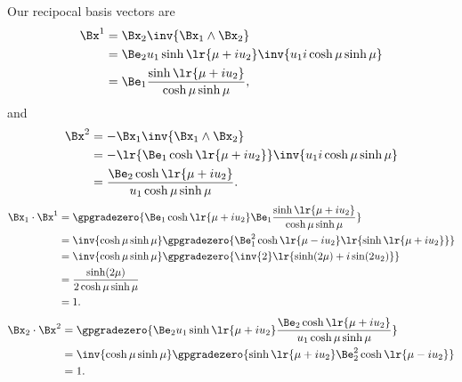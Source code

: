 {Our recipocal basis vectors are
\begin{equation}\label{eqn:ellipticproblem:240}
\begin{aligned}
   \Bx^1
   &= \Bx_2 \inv{ \Bx_1 \wedge \Bx_2 } \\
   &= \Be_2 u_1 \sinh\lr{ \mu + i u_2 } \inv{u_1 i \cosh \mu \sinh \mu} \\
   &= \Be_1 \frac{\sinh\lr{ \mu + i u_2 }}{\cosh \mu \sinh \mu},
\end{aligned}
\end{equation}
and
\begin{equation}\label{eqn:ellipticproblem:180}
\begin{aligned}
\Bx^2
   &= -\Bx_1 \inv{ \Bx_1 \wedge \Bx_2 } \\
   &= -\lr{ \Be_1 \cosh\lr{ \mu + i u_2 } } \inv{ u_1 i \cosh \mu \sinh \mu} \\
   &= \frac{ \Be_2 \cosh\lr{ \mu + i u_2 } }{ u_1 \cosh \mu \sinh \mu}.
\end{aligned}
\end{equation}
\begin{equation}\label{eqn:ellipticproblem:260}
\begin{aligned}
\Bx_1 \cdot \Bx^1
   &= \gpgradezero{
\Be_1 \cosh\lr{ \mu + i u_2 } \Be_1 \frac{\sinh\lr{ \mu + i u_2 }}{\cosh \mu \sinh \mu}
} \\
   &=
\inv{\cosh \mu \sinh \mu}
\gpgradezero{
\Be_1^2 \cosh\lr{ \mu - i u_2 } \lr{\sinh\lr{ \mu + i u_2 }}
} \\
   &=
\inv{\cosh \mu \sinh \mu}
\gpgradezero{
   \inv{2} \lr{ \sinh(2 \mu) + i \sin(2 u_2) }
} \\
&=
\frac{\sinh(2 \mu) }{2 \cosh \mu \sinh \mu} \\
&= 1.
\end{aligned}
\end{equation}
\begin{equation}\label{eqn:ellipticproblem:360}
\begin{aligned}
\Bx_2 \cdot \Bx^2
&=
\gpgradezero{
\Be_2 u_1 \sinh\lr{ \mu + i u_2 }
\frac{ \Be_2 \cosh\lr{ \mu + i u_2 } }{ u_1 \cosh \mu \sinh \mu}
} \\
&=
\inv{ \cosh \mu \sinh \mu}
\gpgradezero{
\sinh\lr{ \mu + i u_2 }
\Be_2^2 \cosh\lr{ \mu - i u_2 }
} \\
&= 1.
\end{aligned}
\end{equation}
\begin{equation}\label{eqn:ellipticproblem:380}

\end{equation}}
